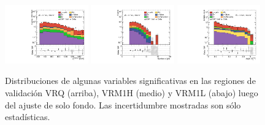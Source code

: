 \begin{figure}[ht!]
    \includegraphics[width=0.32\textwidth]{images/results/fr2_unblind/can_VRM1H_ph_pt0_afterFit.pdf}
    \includegraphics[width=0.32\textwidth]{images/results/fr2_unblind/can_VRM1H_jet_n_afterFit.pdf}
    \includegraphics[width=0.32\textwidth]{images/results/fr2_unblind/can_VRM1H_dphi_jetmet_afterFit.pdf}

    
    \caption{Distribuciones de algunas variables significativas en las regiones de validación VRQ (arriba), VRM1H (medio) y VRM1L (abajo) luego del ajuste de solo fondo. Las incertidumbre mostradas son sólo estadísticas.}
    \label{fig:dist_vrqm_bkgonly}
\end{figure}

